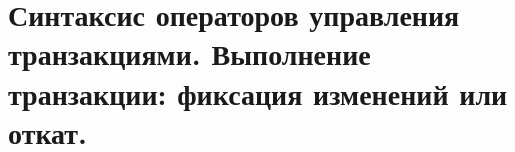 {
	\section{Синтаксис операторов управления транзакциями. Выполнение транзакции: фиксация изменений или откат.}
	\newpage
}

